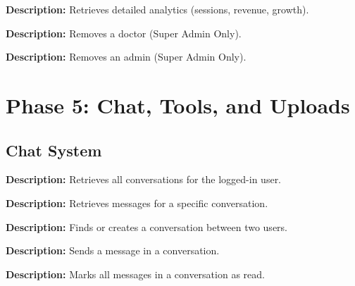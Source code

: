 \documentclass{article}
\begin{document}
\begin{tcolorbox}[title=\textcolor{accent}{GET} /api/admin/approvals/analytics]
\textbf{Description:} Retrieves detailed analytics (sessions, revenue, growth).
\end{tcolorbox}

\begin{tcolorbox}[title=\textcolor{accent}{DELETE} /api/admin/approvals/doctors/:doctorId]
\textbf{Description:} Removes a doctor (Super Admin Only).
\end{tcolorbox}

\begin{tcolorbox}[title=\textcolor{accent}{DELETE} /api/admin/approvals/admins/:adminId]
\textbf{Description:} Removes an admin (Super Admin Only).
\end{tcolorbox}

\section{Phase 5: Chat, Tools, and Uploads}

\subsection{Chat System}

\begin{tcolorbox}[title=\textcolor{accent}{GET} /api/chat/conversations]
\textbf{Description:} Retrieves all conversations for the logged-in user.
\end{tcolorbox}

\begin{tcolorbox}[title=\textcolor{accent}{GET} /api/chat/messages/:conversationId]
\textbf{Description:} Retrieves messages for a specific conversation.
\end{tcolorbox}

\begin{tcolorbox}[title=\textcolor{accent}{POST} /api/chat/conversation]
\textbf{Description:} Finds or creates a conversation between two users.
\end{tcolorbox}

\begin{tcolorbox}[title=\textcolor{accent}{POST} /api/chat/message]
\textbf{Description:} Sends a message in a conversation.
\end{tcolorbox}

\begin{tcolorbox}[title=\textcolor{accent}{PUT} /api/chat/conversation/:conversationId/read]
\textbf{Description:} Marks all messages in a conversation as read.
\end{tcolorbox}
\end{document}
